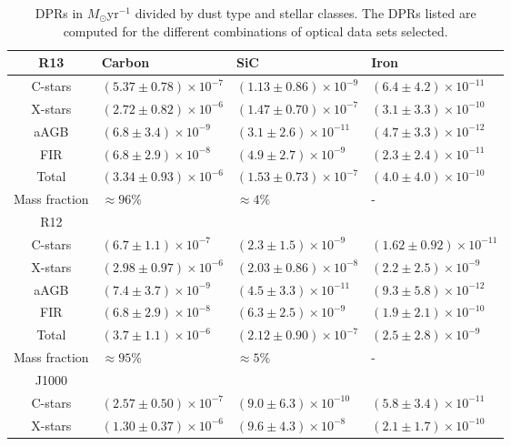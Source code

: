 \documentclass[useAMS,usenatbib]{mn2e/mn2e}
\begin{document}
{\begin{table*}
\begin{center}
\caption{DPRs in $M_{\odot}$yr$^{-1}$ divided by dust type and stellar classes. The DPRs listed are computed for the different combinations of optical data sets selected.}
\label{DPR_i}
\begin{tabular}{c l l l}
\hline
R13& Carbon    &        SiC     &   Iron  \\
\hline
C-stars   & $(5.37\pm0.78)\times10^{-7}$  &   $(1.13\pm0.86) \times10^{-9}$  & $(6.4\pm4.2)\times10^{-11}$  \\  
X-stars  & $(2.72\pm 0.82)\times10^{-6}$  &    $(1.47\pm0.70)\times10^{-7}$  &   $(3.1\pm3.3)\times10^{-10}$\\  
aAGB  & $(6.8\pm3.4)\times10^{-9}$  &     $(3.1\pm2.6)\times10^{-11}$  &     $(4.7\pm3.3)\times10^{-12}$  \\  
FIR &  $(6.8\pm2.9)\times10^{-8}$  &     $(4.9\pm2.7)\times10^{-9}$ & $(2.3\pm2.4)\times10^{-11}$  \\  
Total &  $(3.34\pm0.93)\times10^{-6}$  & $(1.53\pm0.73)\times10^{-7}$  &  $(4.0\pm 4.0)\times10^{-10}$\\
Mass fraction   &   $\approx96\%$  &       $\approx4\%$  &     - \\
\hline
R12& & & \\
\hline
C-stars &  $(6.7\pm1.1)\times10^{-7}$  &     $(2.3\pm1.5)\times10^{-9}$  &  $(1.62\pm0.92)\times10^{-11}$  \\  
X-stars  & $(2.98\pm0.97)\times10^{-6}$  &    $ (2.03\pm0.86)\times10^{-8}$  &   $(2.2\pm2.5)\times10^{-9}$  \\  
aAGB  & $(7.4\pm3.7)\times10^{-9}$  &     $(4.5\pm3.3)\times10^{-11}$  &     $(9.3\pm 5.8)\times10^{-12}$  \\  
FIR  & $(6.8\pm2.9)\times10^{-8}$  &     $(6.3\pm2.5)\times10^{-9}$  &     $(1.9\pm  2.1)\times10^{-10}$  \\ 
Total &  $(3.7\pm 1.1)\times10^{-6}$  &     $(2.12\pm0.90)\times10^{-7}$ &  $(2.5\pm   2.8)\times10^{-9}$\\
Mass fraction   & $\approx95\%$  &       $\approx5\%$  &     -\\
\hline
J1000& & & \\
\hline
C-stars &  $(2.57\pm0.50)\times10^{-7}$  &     $(9.0\pm 6.3)\times10^{-10}$  &  $(5.8\pm3.4)\times10^{-11}$  \\  
X-stars  & $(1.30\pm0.37)\times10^{-6}$   &     $(9.6\pm4.3)\times10^{-8}$  &     $(2.1\pm1.7)\times10^{-10}$  \\

\end{tabular}
\end{center}
\end{table*}}
\end{document}
